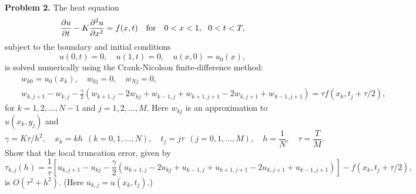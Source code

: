 \documentclass[10pt]{article}
\begin{document}
\vskip 0.5cm
 \noindent
{\bf Problem 2.} The heat equation
\begin{equation}
\frac{\partial u}{\partial t}-K \frac{\partial^{2}u}{\partial
x^{2}}=f(x,t) \quad \hbox{for} \quad 0<x<1, \ \ 0 < t < T, \label{1}
\end{equation}
subject to the boundary and initial conditions
\[
u(0,t)=0, \quad u(1, t)=0, \quad u(x,0)=u_{0}(x),
\]
is solved numerically using the Crank-Nicolson finite-difference method:
\begin{eqnarray}
&&w_{k0}=u_{0}(x_{k}), \quad w_{0j}=0, \quad w_{Nj}=0,   \nonumber \\
&&w_{k,j+1}-w_{k,j}-\frac{\gamma}{2} \left(
w_{k+1,j}-2w_{kj}+w_{k-1,j}+w_{k+1,j+1}-2w_{k,j+1}+w_{k-1,j+1}\right)
=\tau f(x_{k}, t_{j}+\tau/2),  \nonumber
\end{eqnarray}
for $k=1, 2, \dots , N-1$ and $j=1, 2, \dots,M$.
Here $w_{kj}$ is an approximation to $u(x_{k}, y_{j})$ and
\[
\gamma=K\tau/h^{2}, \quad x_{k}=k h \ \ (k=0,1,\dots,N), \quad
t_{j}=j \tau \ \ (j=0,1,\dots,M), \quad h=\frac{1}{N}, \quad \tau=\frac{T}{M}.
\]
Show that the local truncation error, given by
\begin{equation}
\tau_{k,j}(h)=\frac{1}{\tau}\left[u_{k,j+1}-u_{kj}-\frac{\gamma}{2}
\left(
u_{k+1,j}-2u_{kj}+u_{k-1,j}+u_{k+1,j+1}-2u_{k,j+1}+u_{k-1,j+1}\right)\right]
-f(x_{k}, t_{j}+\tau/2), \label{2}
\end{equation}
is $O(\tau^{2}+h^{2})$. (Here $u_{k,j}=u(x_{k}, t_{j})$.)
\end{document}
